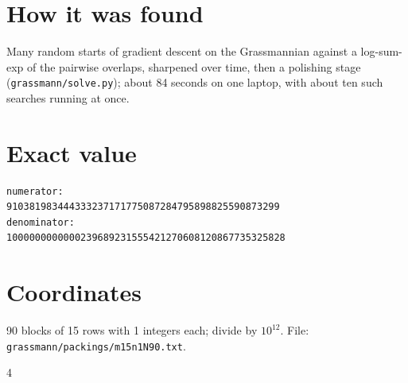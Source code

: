 \documentclass[11pt,a4paper]{article}
\begin{document}
\section{How it was found}
Many random starts of gradient descent on the Grassmannian against a log-sum-exp of the pairwise overlaps, sharpened over time, then a polishing stage (\texttt{grassmann/solve.py}); about 84 seconds on one laptop, with about ten such searches running at once.


\appendix
\section{Exact value}
{\small
\begin{verbatim}
numerator:
910381983444333237171775087284795898825590873299
denominator:
1000000000000239689231555421270608120867735325828
\end{verbatim}}

\section{Coordinates}
90 blocks of 15 rows with 1 integers each; divide by $10^{12}$. File: \texttt{grassmann/packings/m15n1N90.txt}.
{\tiny
\begin{multicols}{4}
\end{multicols}}
\end{document}
